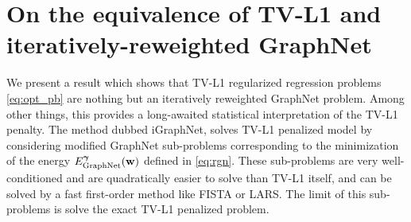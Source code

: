 \section{On the equivalence of TV-L1 and iteratively-reweighted
  GraphNet}\label{chap:igraphnet}

We present a result which shows that TV-L1 regularized regression problems \eqref{eq:opt_pb} are nothing but an iteratively reweighted GraphNet problem. Among other things, this provides a long-awaited statistical interpretation of the TV-L1 penalty. The method dubbed iGraphNet, solves TV-L1 penalized model by considering modified GraphNet sub-problems corresponding to the minimization of the energy
$E_{\text{GraphNet}}^{\boldsymbol{\gamma}}(\mathbf{w})$ defined in \eqref{eq:rgn}. These sub-problems  are very well-conditioned and are quadratically easier to solve than TV-L1 itself, and can be solved by
a fast first-order method like FISTA or LARS. The limit of this sub-problems is solve the exact TV-L1 penalized problem.

